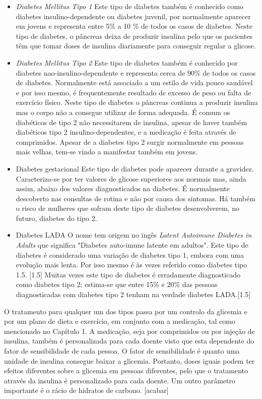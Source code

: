 \begin{itemize}
\item \textit{Diabetes Mellitus Tipo 1} 
Este tipo de diabetes também é conhecido como diabetes insulino-dependente ou diabetes juvenil, por normalmente aparecer em jovens e representa entre 5\% a 10 \% de todos os casos de diabetes. 
Neste tipo de diabetes, o pâncreas deixa de produzir insulina pelo que os pacientes têm que tomar doses de insulina diariamente para conseguir regular a glicose.

\item \textit{Diabetes Mellitus Tipo 2}
Este tipo de diabetes também é conhecido por diabetes nao-insulino-dependente e representa cerca de 90\% de todos os casos de diabetes. Normalmente está associado a um estilo de vida pouco saudável e por isso mesmo, é frequentemente resultado de excesso de peso ou falta de exercício físico. 
Neste tipo de diabetes o pâncreas continua a produzir insulina mas o corpo não a consegue utilizar de forma adequada.  É comum os diabéticos de tipo 2 não necessitarem de insulina, apesar de haver também diabéticos tipo 2 insulino-dependentes, e a medicação é feita através de comprimidos. Apesar de a diabetes tipo 2 surgir normalmente em pessoas mais velhas, tem-se vindo a manifestar também em jovens.

\item {Diabetes gestacional}
Este tipo de diabetes pode aparecer durante a gravidez. Caracteriza-se por ter valores de glicose superiores aos normais mas, ainda assim, abaixo dos valores diagnosticados na diabetes.
É normalmente descoberto nas consultas de rotina e não por causa dos sintomas. Há também o risco de mulheres que sofram deste tipo de diabetes desenvolverem, no futuro, diabetes do tipo 2.

\item {Diabetes LADA}
O nome tem origem no ingês \textit{Latent Autoimune Diabetes in Adults} que significa "Diabetes auto-imune latente em adultos". 
Este tipo de diabetes é considerado uma variação de diabetes tipo 1, embora com uma evolução mais lenta. Por isso mesmo é às vezes referido como diabetes tipo 1.5. [1.5] Muitas vezes este tipo de diabetes é erradamente diagnosticado como diabetes tipo 2: estima-se que entre 15\% e 20\% das pessoas diagnosticadas com diabetes tipo 2 tenham na verdade diabetes LADA.[1.5]
\end{itemize}

O tratamento para qualquer um dos tipos passa por um controlo da glicemia e por um plano de dieta e exercício, em conjunto com a medicação, tal como mencionado no Capítulo 1. A medicação, seja por comprimidos ou por injeção de insulina, também é personalizada para cada doente visto que esta dependente do fator de sensibilidade de cada pessoa.
O fator de sensibilidade é quanto uma unidade de insulina consegue baixar a glicemia. Portanto, doses iguais podem ter efeitos diferentes sobre a glicemia em pessoas diferentes, pelo que o tratamento através da insulina é personalizado para cada doente.
Um outro parâmetro importante é o rácio de hidratos de carbono. [acabar]

